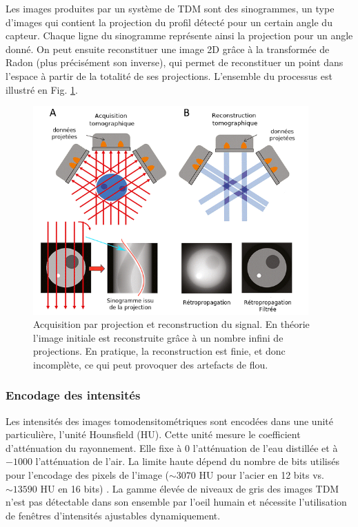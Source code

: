 Les images produites par un système de TDM sont des sinogrammes, un type d'images qui contient la projection du profil détecté pour un certain angle du capteur. Chaque ligne du sinogramme représente ainsi la projection pour un angle donné. On peut ensuite reconstituer une image 2D grâce à la transformée de Radon (plus précisément son inverse), qui permet de reconstituer un point dans l'espace à partir de la totalité de ses projections. L'ensemble du processus est illustré en Fig. \ref{fig:tomography}.

\begin{figure}
    \centering
    \includegraphics[height=8cm]{Images/Tomo_projection_2.png}
    \caption{Acquisition par projection et reconstruction du signal. En théorie l'image initiale est reconstruite grâce à un nombre infini de projections. En pratique, la reconstruction est finie, et donc incomplète, ce qui peut provoquer des artefacts de flou.}
    \label{fig:tomography}
\end{figure}

\subsubsection{Encodage des intensités}

Les intensités des images tomodensitométriques sont encodées dans une unité particulière, l'unité Hounsfield (HU). Cette unité mesure le coefficient d'atténuation du rayonnement. Elle fixe à 0 l'atténuation de l'eau distillée et à $-1000$ l'atténuation de l'air. La limite haute dépend du nombre de bits utilisés pour l'encodage des pixels de l'image ($\sim 3070$ HU pour l'acier en 12 bits vs. $\sim 13590$ HU en 16 bits) \cite{Glide2013_metal_saturation}. La gamme élevée de niveaux de gris des images TDM n'est pas détectable dans son ensemble par l'oeil humain et nécessite l'utilisation de fenêtres d'intensités ajustables dynamiquement.

